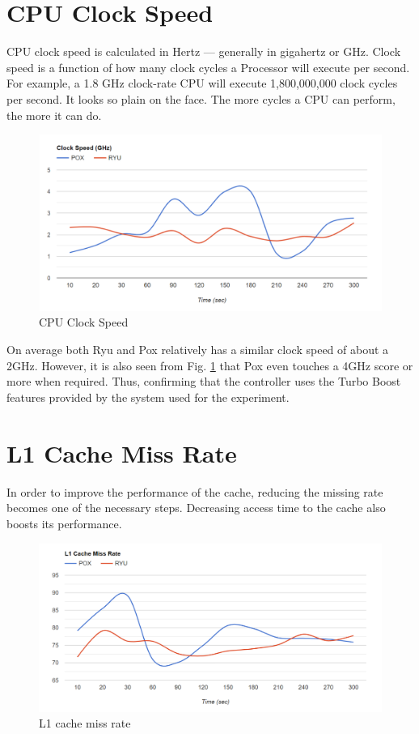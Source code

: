 \section{CPU Clock Speed}

CPU clock speed is calculated in Hertz — generally in gigahertz or GHz. Clock speed is a function of how many
clock cycles a Processor will execute per second. For example, a 1.8 GHz clock-rate CPU will execute 1,800,000,000 clock cycles per second. It looks so plain on the face. The more cycles a CPU can perform, the more it can do.

\begin{figure}[!hbt]
    \centering
        \includegraphics[width=\textwidth,keepaspectratio]{images/clock_speed.png}
       \caption{CPU Clock Speed}
        \label{clockspeed}
\end{figure}

On average both Ryu and Pox relatively has a similar clock speed of about a 2GHz. However, it is also seen from Fig. \ref{clockspeed} that Pox even touches a 4GHz score or more when required. Thus, confirming that the controller uses the Turbo Boost features provided by the system used for the experiment.

\section{L1 Cache Miss Rate}

In order to improve the performance of the cache, reducing the missing rate becomes one of the necessary steps. Decreasing access time to the cache also boosts its performance.

\begin{figure}[!hbt]
    \centering
        \includegraphics[width=\textwidth,keepaspectratio]{images/l1_miss_rate.png}
       \caption{L1 cache miss rate}
        \label{l1missrate}
\end{figure}

